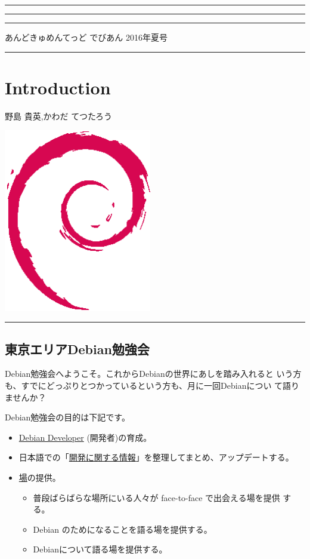 \documentclass[mingoth,a4paper]{jsarticle}
\renewcommand{\dancersection}[2]{%
\newpage
あんどきゅめんてっど でびあん 2016年夏号
%
\vspace{0.1mm}\\
{\color{dancerdarkblue}\rule{\hsize}{2mm}}

%
%
\begin{minipage}[t]{0.6\hsize}
\color{dancerdarkblue}
\vspace{1cm}
\section{#1}
\hfill{}#2\\
\end{minipage}
\begin{minipage}[t]{0.4\hsize}
\vspace{-2cm}
\hfill{}\includegraphics[height=8cm]{image200502/openlogo-nd.eps}\\
\vspace{-5cm}
\end{minipage}
%
{\color{dancerlightblue}\rule{0.66\hsize}{2mm}}
%
\vspace{2cm}
}
\begin{document}
\setcounter{page}{1}
\begin{minipage}[]{0.2\hsize}
 \colorbox{dancerlightblue}{}
\end{minipage}
\begin{minipage}[]{0.8\hsize}
\hrule
\vspace{1mm}
\hrule
\setcounter{tocdepth}{1}
{\small
\begin{multicols}{2}
  \tableofcontents
\end{multicols}
} %
\vspace{1mm}
\hrule
\vspace{3cm}

\end{minipage}

\dancersection{Introduction}{野島 貴英,かわだ てつたろう}

\subsection{東京エリアDebian勉強会}

 Debian勉強会へようこそ。これからDebianの世界にあしを踏み入れると
 いう方も、すでにどっぷりとつかっているという方も、月に一回Debianについ
 て語りませんか？

 Debian勉強会の目的は下記です。

\begin{itemize}
 \item \underline{Debian Developer} (開発者)の育成。
 \item 日本語での「\underline{開発に関する情報}」を整理してまとめ、アップデートする。
 \item \underline{場}の提供。
 \begin{itemize}
  \item 普段ばらばらな場所にいる人々が face-to-face で出会える場を提供
	する。
  \item Debian のためになることを語る場を提供する。
  \item Debianについて語る場を提供する。
 \end{itemize}
\end{itemize}
\end{document}
